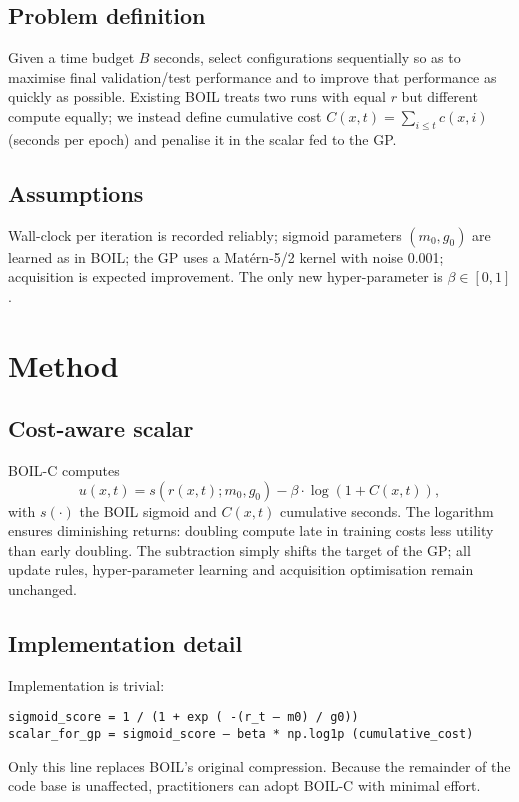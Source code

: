 \documentclass{article} %
\begin{document}
\subsection{Problem definition}
Given a time budget \(B\) seconds, select configurations sequentially so as to maximise final validation/test performance and to improve that performance as quickly as possible. Existing BOIL treats two runs with equal \(r\) but different compute equally; we instead define cumulative cost \(C(x,t)=\sum_{i\le t} c(x,i)\) (seconds per epoch) and penalise it in the scalar fed to the GP.

\subsection{Assumptions}
Wall-clock per iteration is recorded reliably; sigmoid parameters \((m_0,g_0)\) are learned as in BOIL; the GP uses a Mat\'ern-5/2 kernel with noise 0.001; acquisition is expected improvement. The only new hyper-parameter is \(\beta\in[0,1]\).

\section{Method}
\label{sec:method}
\subsection{Cost-aware scalar}
BOIL-C computes
\[
 u(x,t)=s(r(x,t);m_0,g_0)-\beta\cdot\log(1+C(x,t)),
\]
with \(s(\cdot)\) the BOIL sigmoid and \(C(x,t)\) cumulative seconds. The logarithm ensures diminishing returns: doubling compute late in training costs less utility than early doubling. The subtraction simply shifts the target of the GP; all update rules, hyper-parameter learning and acquisition optimisation remain unchanged.

\subsection{Implementation detail}
Implementation is trivial:

\noindent\texttt{sigmoid\_score = 1 / (1 + exp ( -(r\_t -- m0) / g0))}\\
\texttt{scalar\_for\_gp = sigmoid\_score -- beta * np.log1p (cumulative\_cost)}

Only this line replaces BOIL's original compression. Because the remainder of the code base is unaffected, practitioners can adopt BOIL-C with minimal effort.
\end{document}
